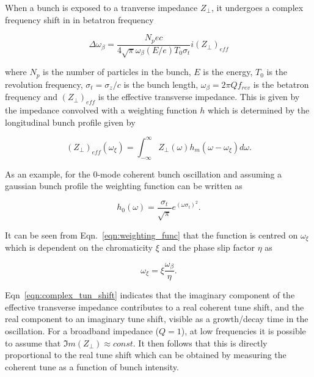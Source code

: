 When a bunch is exposed to a tranverse impedance $Z_{\perp}$, it undergoes a complex frequency shift in in betatron frequency


\begin{equation}
\Delta{}\omega_{\beta} = \frac{N_{p}ec}{4\sqrt{\pi}\omega_{\beta} \left( E/e \right)T_{0}\sigma_{t}} i\left( Z_{\perp} \right)_{eff}
\label{eqn:complex_tun_shift}
\end{equation}

where $N_{p}$ is the number of particles in the bunch, $E$ is the energy, $T_{0}$ is the revolution frequency, $\sigma_{t} = \sigma_{z}/c$ is the bunch length, $\omega_{\beta} = 2\pi{}Q f_{rev}$ is the betatron frequency and $\left( Z_{\perp} \right)_{eff}$ is the effective transverse impedance. This is given by the impedance convolved with a weighting function $h$ which is determined by the longitudinal bunch profile given by

\begin{equation}
\left( Z_{\perp} \right)_{eff} \left( \omega_{\xi} \right) = \int_{-\infty}^{\infty} Z_{\perp} \left( \omega \right) h_{m} \left(  \omega - \omega_{\xi} \right) d\omega.
\end{equation}

As an example, for the 0-mode coherent bunch oscillation and assuming a gaussian bunch profile the weighting function can be written as

\begin{equation}
h_{0} \left( \omega \right) = \frac{\sigma_{t}}{\sqrt{\pi}}e^{ \left(  \omega \sigma_{t}  \right)^{2}}.
\label{eqn:weighting_func}
\end{equation}

It can be seen from Eqn.~\ref{eqn:weighting_func} that the function is centred on $\omega_{\xi}$ which is dependent on the chromaticity $\xi$ and the phase slip factor $\eta$ as

\begin{equation}
\omega_{\xi} = \xi \frac{\omega_{\beta}}{\eta}.
\end{equation}

Eqn~\ref{eqn:complex_tun_shift} indicates that the imaginary component of the effective transverse impedance contributes to a real coherent tune shift, and the real component to an imaginary tune shift, visible as a growth/decay time in the oscillation. For a broadband impedance ($Q=1$), at low frequencies it is possible to assume that $\Im{}m\left(  Z_{\perp} \right) \approx const.$ It then follows that this is directly proportional to the real tune shift which can be obtained by measuring the coherent tune as a function of bunch intensity.


